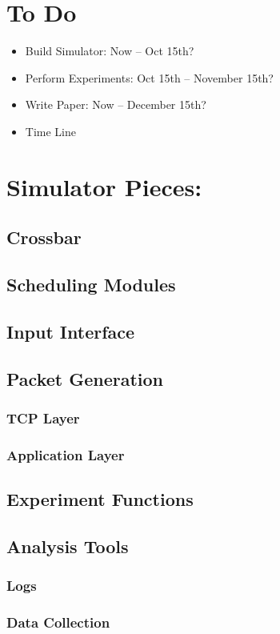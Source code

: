 \documentclass{IEEEtran}%
\begin{document}
\section{To Do}
\begin{itemize}
\item Build Simulator: Now -- Oct 15th?
\item Perform Experiments: Oct 15th -- November 15th?
\item Write Paper: Now -- December 15th?
\item Time Line
\end{itemize}

\section{Simulator Pieces:}
\subsection{Crossbar}
\subsection{Scheduling Modules}
\subsection{Input Interface}
\subsection{Packet Generation}
\subsubsection{TCP Layer}
\subsubsection{Application Layer}
\subsection{Experiment Functions}
\subsection{Analysis Tools}
\subsubsection{Logs}
\subsubsection{Data Collection}
\end{document}
